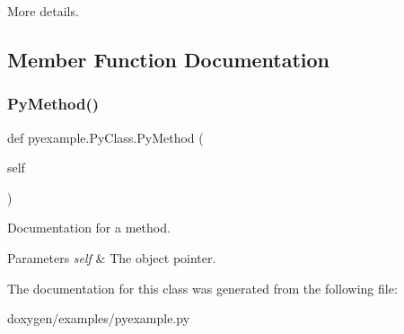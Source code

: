 More details. 

\subsection{Member Function Documentation}
\mbox{\label{classpyexample_1_1_py_class_a654596774eb28a0c6d26eea565de3a9d}} 
\subsubsection{\texorpdfstring{PyMethod()}{PyMethod()}}
{\footnotesize\ttfamily def pyexample.\+Py\+Class.\+Py\+Method (\begin{DoxyParamCaption}\item[{}]{self }\end{DoxyParamCaption})}



Documentation for a method. 


\begin{DoxyParams}{Parameters}
{\em self} & The object pointer. \\
\hline
\end{DoxyParams}


The documentation for this class was generated from the following file\+:\begin{DoxyCompactItemize}
\item 
doxygen/examples/pyexample.\+py\end{DoxyCompactItemize}
